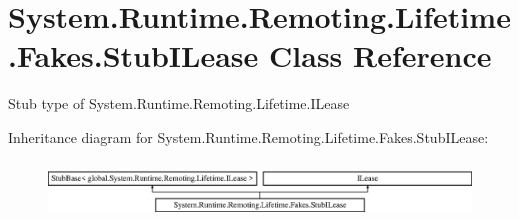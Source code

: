 \hypertarget{class_system_1_1_runtime_1_1_remoting_1_1_lifetime_1_1_fakes_1_1_stub_i_lease}{\section{System.\-Runtime.\-Remoting.\-Lifetime.\-Fakes.\-Stub\-I\-Lease Class Reference}
\label{class_system_1_1_runtime_1_1_remoting_1_1_lifetime_1_1_fakes_1_1_stub_i_lease}
}


Stub type of System.\-Runtime.\-Remoting.\-Lifetime.\-I\-Lease 


Inheritance diagram for System.\-Runtime.\-Remoting.\-Lifetime.\-Fakes.\-Stub\-I\-Lease\-:\begin{figure}[H]
\begin{center}
\leavevmode
\includegraphics[height=1.530055cm]{class_system_1_1_runtime_1_1_remoting_1_1_lifetime_1_1_fakes_1_1_stub_i_lease}
\end{center}
\end{figure}

